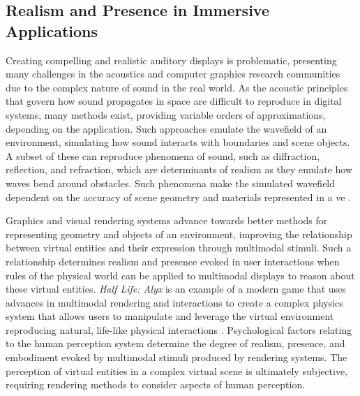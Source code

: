 \subsection{Realism and Presence in Immersive Applications}
Creating compelling and realistic auditory displays is problematic, presenting many challenges in the acoustics and computer graphics research communities due to the complex nature of sound in the real world. As the acoustic principles that govern how sound propagates in space are difficult to reproduce in digital systems, many methods exist, providing variable orders of approximations, depending on the application. Such approaches emulate the wavefield of an environment, simulating how sound interacts with boundaries and scene objects. A subset of these can reproduce phenomena of sound, such as diffraction, reflection, and refraction, which are determinants of realism as they emulate how waves bend around obstacles. Such phenomena make the simulated wavefield dependent on the accuracy of scene geometry and materials represented in a \acrshort{ve} \citep{kuttruff2016room}.\par
Graphics and visual rendering systems advance towards better methods for representing geometry and objects of an environment, improving the relationship between virtual entities and their expression through multimodal stimuli. Such a relationship determines realism and presence evoked in user interactions when rules of the physical world can be applied to multimodal displays to reason about these virtual entities. \textit{Half Life: Alyx} is an example of a modern game that uses advances in multimodal rendering and interactions to create a complex physics system that allows users to manipulate and leverage the virtual environment reproducing natural, life-like physical interactions \citep{bollmer2022embodied}.
Psychological factors relating to the human perception system determine the degree of realism, presence, and embodiment evoked by multimodal stimuli produced by rendering systems. The perception of virtual entities in a complex virtual scene is ultimately subjective, requiring rendering methods to consider aspects of human perception.

